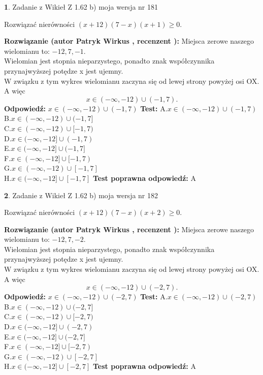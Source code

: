 \documentclass[12pt, a4paper]{article}
\theoremstyle{definition} %
\newtheorem{zad}{}
\newcommand{\zadStart}[1]{\begin{zad}#1\newline}
\newcommand{\zadStop}{\end{zad}}
\newcommand{\rozwStart}[2]{\noindent \textbf{Rozwiązanie (autor #1 , recenzent #2): }\newline}
\newcommand{\rozwStop}{\newline}
\newcommand{\odpStart}{\noindent \textbf{Odpowiedź:}\newline}
\newcommand{\odpStop}{\newline}
\newcommand{\testStart}{\noindent \textbf{Test:}\newline}
\newcommand{\testStop}{\newline}
\newcommand{\kluczStart}{\noindent \textbf{Test poprawna odpowiedź:}\newline}
\newcommand{\kluczStop}{\newline}
\begin{document}
\zadStart{Zadanie z Wikieł Z 1.62 b) moja wersja nr 181}

Rozwiązać nierówności $(x+12)(7-x)(x+1)\ge0$.
\zadStop
\rozwStart{Patryk Wirkus}{}
Miejsca zerowe naszego wielomianu to: $-12, 7, -1$.\\
Wielomian jest stopnia nieparzystego, ponadto znak współczynnika przy\linebreak najwyższej potędze x jest ujemny.\\ W związku z tym wykres wielomianu zaczyna się od lewej strony powyżej osi OX. A więc $$x \in (-\infty,-12) \cup (-1,7).$$
\rozwStop
\odpStart
$x \in (-\infty,-12) \cup (-1,7)$
\odpStop
\testStart
A.$x \in (-\infty,-12) \cup (-1,7)$\\
B.$x \in (-\infty,-12) \cup (-1,7]$\\
C.$x \in (-\infty,-12) \cup [-1,7)$\\
D.$x \in (-\infty,-12] \cup (-1,7)$\\
E.$x \in (-\infty,-12] \cup (-1,7]$\\
F.$x \in (-\infty,-12] \cup [-1,7)$\\
G.$x \in (-\infty,-12) \cup [-1,7]$\\
H.$x \in (-\infty,-12] \cup [-1,7]$
\testStop
\kluczStart
A
\kluczStop



\zadStart{Zadanie z Wikieł Z 1.62 b) moja wersja nr 182}

Rozwiązać nierówności $(x+12)(7-x)(x+2)\ge0$.
\zadStop
\rozwStart{Patryk Wirkus}{}
Miejsca zerowe naszego wielomianu to: $-12, 7, -2$.\\
Wielomian jest stopnia nieparzystego, ponadto znak współczynnika przy\linebreak najwyższej potędze x jest ujemny.\\ W związku z tym wykres wielomianu zaczyna się od lewej strony powyżej osi OX. A więc $$x \in (-\infty,-12) \cup (-2,7).$$
\rozwStop
\odpStart
$x \in (-\infty,-12) \cup (-2,7)$
\odpStop
\testStart
A.$x \in (-\infty,-12) \cup (-2,7)$\\
B.$x \in (-\infty,-12) \cup (-2,7]$\\
C.$x \in (-\infty,-12) \cup [-2,7)$\\
D.$x \in (-\infty,-12] \cup (-2,7)$\\
E.$x \in (-\infty,-12] \cup (-2,7]$\\
F.$x \in (-\infty,-12] \cup [-2,7)$\\
G.$x \in (-\infty,-12) \cup [-2,7]$\\
H.$x \in (-\infty,-12] \cup [-2,7]$
\testStop
\kluczStart
A
\kluczStop
\end{document}
